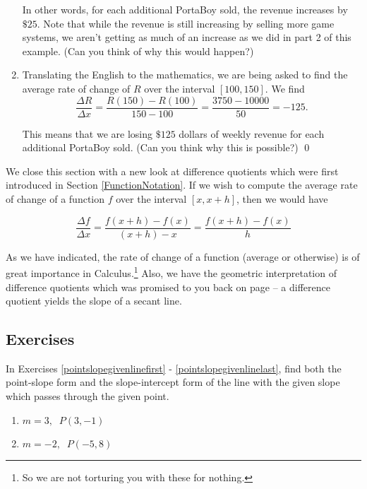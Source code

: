 \begin{ex}
\begin{enumerate}
In other words, for each additional PortaBoy sold, the revenue increases by $\$25$.  Note that while the revenue is still increasing by selling more game systems, we aren't getting as much of an increase as we did in part 2 of this example. (Can you think of why this would happen?)

\item  Translating the English to the mathematics, we are being asked to find the average rate of change of $R$ over the interval $[100,150]$.  We find \[ \dfrac{\Delta R}{\Delta x} = \dfrac{R(150) - R(100)}{150-100} = \dfrac{3750 - 10000}{50} = -125.\]

This means that we are losing $\$125$ dollars of weekly revenue for each additional PortaBoy sold.  (Can you think why this is possible?) \qed

\end{enumerate}



\end{ex}

We close this section with a new look at difference quotients which were first introduced in Section \ref{FunctionNotation}.  If we wish to compute the average rate of change of a function $f$ over the interval $[x, x+h]$, then we would have

\[ \dfrac{\Delta f}{\Delta x} = \dfrac{f(x+h) - f(x)}{(x+h) - x} = \dfrac{f(x+h) - f(x)}{h}\]

As we have indicated, the rate of change of a function (average or otherwise) is of great importance in Calculus.\footnote{So we are not torturing you with these for nothing.} Also, we have the geometric interpretation of difference quotients which was promised to you back on page \pageref{diffquotgeompromise} -- a difference quotient yields the slope of a secant line.

\newpage

\subsection{Exercises}

In Exercises \ref{pointslopegivenlinefirst} - \ref{pointslopegivenlinelast}, find both the point-slope form and the slope-intercept form of the line with the given slope which passes through the given point.

\begin{multicols}{2}
\begin{enumerate}

\item $m = 3, \;\; P(3, -1)$ \label{pointslopegivenlinefirst}
\item $m = -2, \;\; P(-5, 8)$

\setcounter{HW}{\value{enumi}}
\end{enumerate}
\end{multicols}

